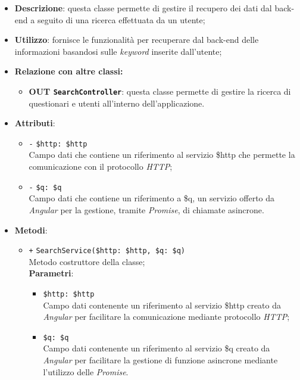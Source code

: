 \begin{itemize}
	\item \textbf{Descrizione}: questa classe permette di gestire il recupero dei dati dal back-end a seguito di una ricerca effettuata da un utente;
	\item \textbf{Utilizzo}: fornisce le funzionalità per recuperare dal back-end delle informazioni basandosi sulle \textit{keyword} inserite dall'utente;
	\item \textbf{Relazione con altre classi:}
	\begin{itemize}
		\item \textbf{OUT \texttt{SearchController}}: questa classe permette di gestire la ricerca di questionari e utenti all'interno dell'applicazione.
	\end{itemize}
	\item \textbf{Attributi}:
	\begin{itemize}
		\item \texttt{-} \texttt{\$http: \$http} \\ Campo dati che contiene un riferimento al servizio \$http che permette la comunicazione con il protocollo \textit{HTTP};
		\item \texttt{-} \texttt{\$q: \$q} \\ Campo dati che contiene un riferimento a \$q, un servizio offerto da \textit{Angular} per la gestione, tramite \textit{Promise}, di chiamate asincrone. 
	\end{itemize}
	\item \textbf{Metodi}:
	\begin{itemize}
		\item \texttt{+} \texttt{SearchService(\$http: \$http, \$q: \$q)} \\ Metodo costruttore della classe; \\
		\textbf{Parametri}:
		\begin{itemize}
			\item \texttt{\$http: \$http} \\ Campo dati contenente un riferimento al servizio \$http creato da \textit{Angular} per facilitare la comunicazione mediante protocollo \textit{HTTP};
			\item \texttt{\$q: \$q} \\ Campo dati contenente un riferimento al servizio \$q creato da \textit{Angular} per facilitare la gestione di funzione asincrone mediante l’utilizzo delle \textit{Promise}.
		\end{itemize}

\end{itemize}
\end{itemize}
